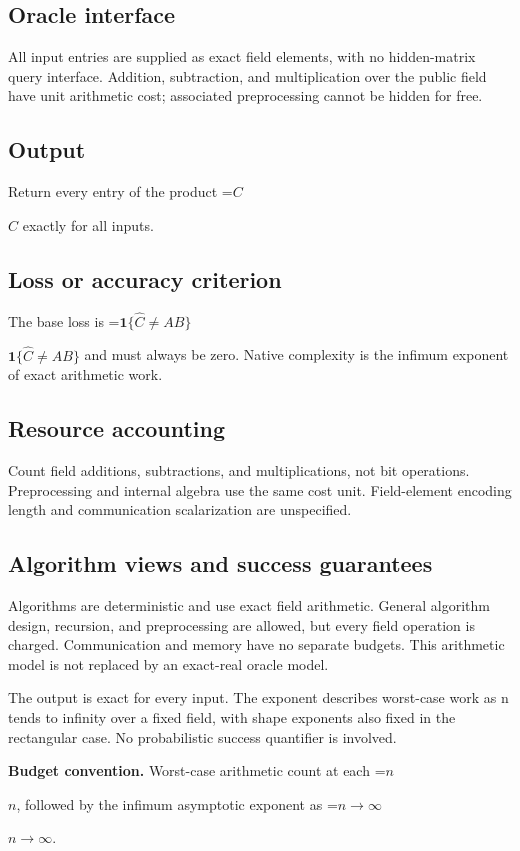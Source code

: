 \documentclass[10pt,a4paper]{article}
\newcommand{\AtlasMath}[1]{\par\begingroup\centering\setbox0=\hbox{$\displaystyle #1$}\ifdim\wd0>1.4\linewidth\typeout{ATLAS WIDE FORMULA: \the\wd0}\fi\ifdim\wd0>\linewidth\resizebox{\linewidth}{!}{\box0}\else\box0\fi\par\endgroup}
\newcommand{\AtlasInlineMath}[1]{\begingroup\setbox0=\hbox{$#1$}\ifdim\wd0>.4\linewidth\endgroup\AtlasMath{#1}\else\endgroup$#1$\fi}
\begin{document}
\subsection{Oracle interface}
All input entries are supplied as exact field elements, with no hidden-matrix query interface. Addition, subtraction, and multiplication over the public field have unit arithmetic cost; associated preprocessing cannot be hidden for free.

\subsection{Output}
Return every entry of the product \AtlasInlineMath{C} exactly for all inputs.

\subsection{Loss or accuracy criterion}
The base loss is \AtlasInlineMath{\mathbf1\{\widehat C\ne AB\}} and must always be zero. Native complexity is the infimum exponent of exact arithmetic work.

\subsection{Resource accounting}
Count field additions, subtractions, and multiplications, not bit operations. Preprocessing and internal algebra use the same cost unit. Field-element encoding length and communication scalarization are unspecified.

\subsection{Algorithm views and success guarantees}
Algorithms are deterministic and use exact field arithmetic. General algorithm design, recursion, and preprocessing are allowed, but every field operation is charged. Communication and memory have no separate budgets. This arithmetic model is not replaced by an exact-real oracle model.

The output is exact for every input. The exponent describes worst-case work as n tends to infinity over a fixed field, with shape exponents also fixed in the rectangular case. No probabilistic success quantifier is involved.

\textbf{Budget convention.} Worst-case arithmetic count at each \AtlasInlineMath{n}, followed by the infimum asymptotic exponent as \AtlasInlineMath{n\to\infty}.
\end{document}
